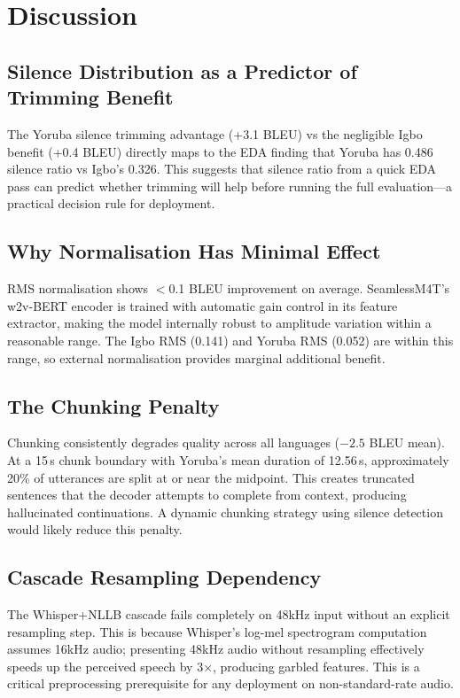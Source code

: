 \documentclass[a4paper]{article}
\begin{document}
\section{Discussion}
\label{sec:discussion}

\subsection{Silence Distribution as a Predictor of Trimming Benefit}
The Yoruba silence trimming advantage (+3.1 BLEU) vs the negligible Igbo benefit (+0.4 BLEU) directly maps to the EDA finding that Yoruba has 0.486 silence ratio vs Igbo's 0.326. This suggests that silence ratio from a quick EDA pass can predict whether trimming will help before running the full evaluation—a practical decision rule for deployment.

\subsection{Why Normalisation Has Minimal Effect}
RMS normalisation shows $<$0.1 BLEU improvement on average. SeamlessM4T's w2v-BERT encoder is trained with automatic gain control in its feature extractor, making the model internally robust to amplitude variation within a reasonable range. The Igbo RMS (0.141) and Yoruba RMS (0.052) are within this range, so external normalisation provides marginal additional benefit.

\subsection{The Chunking Penalty}
Chunking consistently degrades quality across all languages ($-2.5$ BLEU mean). At a 15\,s chunk boundary with Yoruba's mean duration of 12.56\,s, approximately 20\% of utterances are split at or near the midpoint. This creates truncated sentences that the decoder attempts to complete from context, producing hallucinated continuations. A dynamic chunking strategy using silence detection would likely reduce this penalty.

\subsection{Cascade Resampling Dependency}
The Whisper+NLLB cascade fails completely on 48kHz input without an explicit resampling step. This is because Whisper's log-mel spectrogram computation assumes 16kHz audio; presenting 48kHz audio without resampling effectively speeds up the perceived speech by 3×, producing garbled features. This is a critical preprocessing prerequisite for any deployment on non-standard-rate audio.
\end{document}
